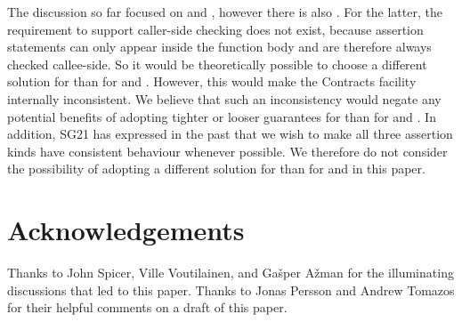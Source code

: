 The discussion so far focused on  and , however there is also . For the latter, the requirement to support caller-side checking does not exist, because assertion statements can only appear inside the function body and are therefore always checked callee-side. So it would be theoretically possible to choose a different solution for   than for  and . However, this would make the Contracts facility internally inconsistent. We believe that such an inconsistency would negate any potential benefits of adopting tighter or looser guarantees for  than for  and . In addition, SG21 has expressed in the past that we wish to make all three assertion kinds have consistent behaviour whenever possible. We therefore do not consider the possibility of adopting a different solution for  than for  and  in this paper.


\section*{Acknowledgements}
Thanks to John Spicer, Ville Voutilainen, and Ga\v sper A\v zman for the illuminating discussions that led to this paper. Thanks to Jonas Persson and Andrew Tomazos for their helpful comments on a draft of this paper.


\pagebreak %

\renewcommand{\bibname}{References}





